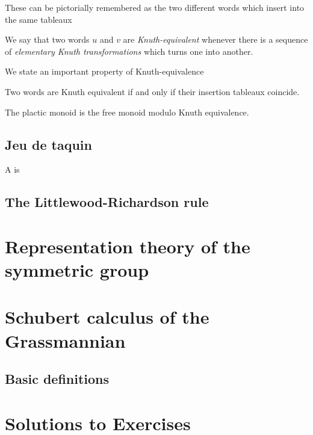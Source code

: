 \documentclass{article}
\begin{document}
These can be pictorially remembered as the two different words which insert into the same tableaux

\begin{definition}
    We say that two words $u$ and $v$ are \textit{Knuth-equivalent} whenever there is a sequence of \textit{elementary Knuth transformations} which turns one into another.
\end{definition}

We state an important property of Knuth-equivalence

\begin{theorem}
    Two words are Knuth equivalent if and only if their insertion tableaux coincide.
\end{theorem}

\begin{corollary}
    The plactic monoid is the free monoid modulo Knuth equivalence.
\end{corollary}


\subsection{Jeu de taquin}

\begin{definition}
    A  is
\end{definition}

\subsection{The Littlewood-Richardson rule}

\section{Representation theory of the symmetric group}

\section{Schubert calculus of the Grassmannian}

\subsection{Basic definitions}





\iffalse 

\section{Solutions to Exercises}
\end{document}
